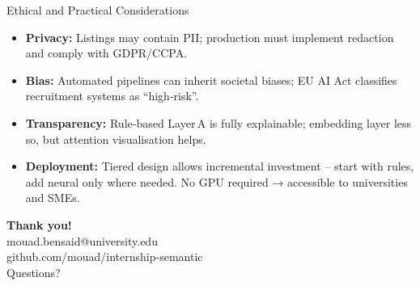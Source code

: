 \documentclass[aspectratio=169, 10pt]{beamer}
\begin{document}
\begin{frame}{Ethical and Practical Considerations}
\begin{itemize}
\item \textbf{Privacy:} Listings may contain PII; production must implement redaction and comply with GDPR/CCPA.
\item \textbf{Bias:} Automated pipelines can inherit societal biases; EU AI Act classifies recruitment systems as “high‑risk”.
\item \textbf{Transparency:} Rule‑based Layer A is fully explainable; embedding layer less so, but attention visualisation helps.
\item \textbf{Deployment:} Tiered design allows incremental investment – start with rules, add neural only where needed. No GPU required → accessible to universities and SMEs.
\end{itemize}
\end{frame}

\begin{frame}[standout]
\centering
\Huge \textbf{Thank you!} \\[1cm]
\Large \faEnvelope \quad mouad.bensaid@university.edu \\[0.3cm]
\faGithub \quad github.com/mouad/internship-semantic \\[0.3cm]
\vspace{1cm}
\normalsize Questions?
\end{frame}
\end{document}
